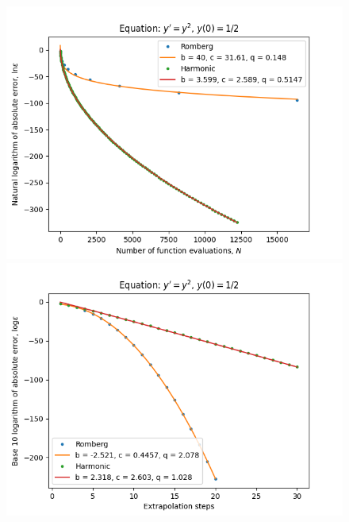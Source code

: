 \begin{figure}[H]
\centering
\begin{minipage}{0.45\textwidth}
\centering
\includegraphics[scale=0.45]{emr_plots/singularity_0_hp_trend.png}
\end{minipage}
\begin{minipage}{0.45\textwidth}
\centering
\includegraphics[scale=0.45]{emr_plots/singularity_0_hp_steps.png}
\end{minipage}
\end{figure}

